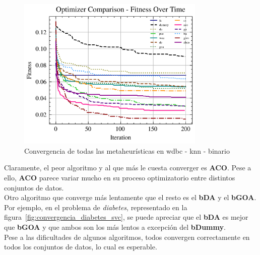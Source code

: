 \begin{figure}[htp]
    \includegraphics[width=0.8\textwidth]{imagenes/fitness_charts/img/binary/wdbc/optimizers_fitness_knn.png}
    \caption{Convergencia de todas las metaheurísticas en wdbc - knn - binario}
\end{figure}

Claramente, el peor algoritmo y al que más le cuesta converger es \textbf{ACO}. Pese a ello, \textbf{ACO} parece variar mucho en su proceso optimizatorio entre distintos conjuntos de datos.\\[6pt]
Otro algoritmo que converge más lentamente que el resto es el \textbf{bDA} y el \textbf{bGOA}. Por ejemplo, en el problema de \textit{diabetes}, representado en la figura~\ref{fig:convergencia_diabetes_svc}, se puede apreciar que el \textbf{bDA} es mejor que \textbf{bGOA} y que ambos son los más lentos a excepción del \textbf{bDummy}. \\[6pt]

Pese a las dificultades de algunos algoritmos, todos convergen correctamente en todos los conjuntos de datos, lo cual es esperable.


